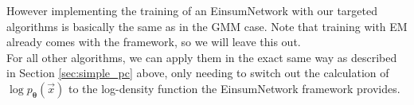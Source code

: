 However implementing the training of an EinsumNetwork with our targeted algorithms is basically the same 
as in the GMM case. Note that training with EM already comes with the framework, so we will leave this out. \\
For all other algorithms, we can apply them in the exact same way as described in Section \ref{sec:simple_pc} above, only needing 
to switch out the calculation of $\log p_{\boldsymbol{\theta}}(\vec x)$ to the log-density function the EinsumNetwork framework provides. 
